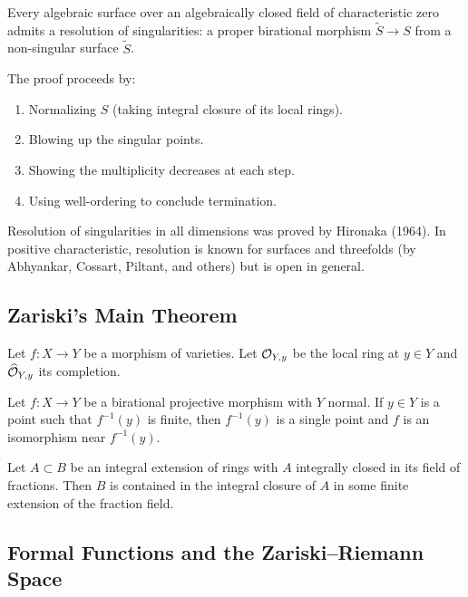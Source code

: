 \begin{theorem}[Zariski, 1939]
Every algebraic surface over an algebraically closed field of characteristic zero admits a resolution of singularities: a proper birational morphism $\tilde S \to S$ from a non-singular surface $\tilde S$.
\end{theorem}

The proof proceeds by:
\begin{enumerate}
    \item Normalizing $S$ (taking integral closure of its local rings).
    \item Blowing up the singular points.
    \item Showing the multiplicity decreases at each step.
    \item Using well-ordering to conclude termination.
\end{enumerate}

\begin{remark}
Resolution of singularities in all dimensions was proved by Hironaka (1964). In positive characteristic, resolution is known for surfaces and threefolds (by Abhyankar, Cossart, Piltant, and others) but is open in general.
\end{remark}

\subsection{Zariski's Main Theorem}

Let $f: X \to Y$ be a morphism of varieties. Let $\mathcal{O}_{Y,y}$ be the local ring at $y \in Y$ and $\widehat{\mathcal{O}}_{Y,y}$ its completion.

\begin{theorem}
Let $f: X \to Y$ be a birational projective morphism with $Y$ normal. If $y \in Y$ is a point such that $f^{-1}(y)$ is finite, then $f^{-1}(y)$ is a single point and $f$ is an isomorphism near $f^{-1}(y)$.
\end{theorem}

\begin{theorem}
Let $A \subset B$ be an integral extension of rings with $A$ integrally closed in its field of fractions. Then $B$ is contained in the integral closure of $A$ in some finite extension of the fraction field.
\end{theorem}

\subsection{Formal Functions and the Zariski--Riemann Space}

